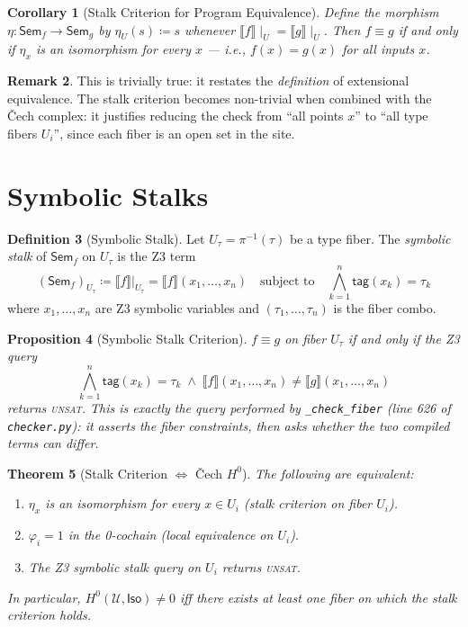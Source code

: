 \documentclass[11pt,a4paper]{report}
\theoremstyle{definition}
\newtheorem{definition}{Definition}[chapter]
\newtheorem{remark}[definition]{Remark}
\theoremstyle{plain}
\newtheorem{theorem}[definition]{Theorem}
\newtheorem{proposition}[definition]{Proposition}
\newtheorem{corollary}[definition]{Corollary}
\newcommand{\den}[1]{\llbracket #1 \rrbracket}
\newcommand{\covers}{\mathcal{U}}
\newcommand{\Sem}{\mathsf{Sem}}
\newcommand{\Iso}{\mathsf{Iso}}
\newcommand{\Hzero}{H^0}
\newcommand{\restr}[2]{#1\!\!\mid_{#2}}
\begin{document}
\begin{corollary}[Stalk Criterion for Program Equivalence]
\label{cor:stalk-equiv}
Define the morphism $\eta : \Sem_f \to \Sem_g$ by
$\eta_U(s) \coloneqq s$ whenever $\restr{\den{f}}{U} = \restr{\den{g}}{U}$.
Then $f \equiv g$ if and only if $\eta_x$ is an isomorphism for
every $x$ --- i.e., $f(x) = g(x)$ for all inputs $x$.
\end{corollary}

\begin{remark}
This is trivially true: it restates the \emph{definition} of
extensional equivalence.  The stalk criterion becomes non-trivial
when combined with the \v{C}ech complex: it justifies reducing the
check from ``all points $x$'' to ``all type fibers $U_i$'', since
each fiber is an open set in the site.
\end{remark}

\section{Symbolic Stalks}

\begin{definition}[Symbolic Stalk]
\label{def:symbolic-stalk}
Let $U_\tau = \pi^{-1}(\tau)$ be a type fiber.  The \emph{symbolic
stalk} of $\Sem_f$ on $U_\tau$ is the Z3 term
\[
  (\Sem_f)_{U_\tau} \coloneqq \den{f}\bigl|_{U_\tau}
  = \den{f}(x_1, \ldots, x_n)
  \quad\text{subject to}\quad
  \bigwedge_{k=1}^{n} \mathsf{tag}(x_k) = \tau_k
\]
where $x_1, \ldots, x_n$ are Z3 symbolic variables and
$(\tau_1, \ldots, \tau_n)$ is the fiber combo.
\end{definition}

\begin{proposition}[Symbolic Stalk Criterion]
\label{prop:symbolic-stalk}
$f \equiv g$ on fiber $U_\tau$ if and only if the Z3 query
\[
  \bigwedge_{k=1}^{n} \mathsf{tag}(x_k) = \tau_k
  \;\wedge\;
  \den{f}(x_1, \ldots, x_n) \neq \den{g}(x_1, \ldots, x_n)
\]
returns \textsc{unsat}.  This is exactly the query performed by
\texttt{\_check\_fiber} (line 626 of \texttt{checker.py}):
it asserts the fiber constraints, then asks whether the two
compiled terms can differ.
\end{proposition}

\begin{theorem}[Stalk Criterion $\Longleftrightarrow$ \v{C}ech $\Hzero$]
\label{thm:stalk-h0}
The following are equivalent:
\begin{enumerate}
  \item $\eta_x$ is an isomorphism for every $x \in U_i$ (stalk
    criterion on fiber $U_i$).
  \item $\varphi_i = 1$ in the 0-cochain (local equivalence on $U_i$).
  \item The Z3 symbolic stalk query on $U_i$ returns \textsc{unsat}.
\end{enumerate}
In particular, $\Hzero(\covers, \Iso) \neq 0$ iff there exists at
least one fiber on which the stalk criterion holds.
\end{theorem}
\end{document}

